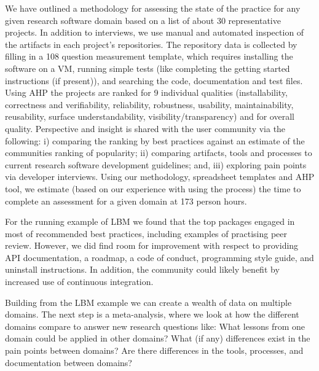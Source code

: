 \documentclass[runningheads]{llncs}
\begin{document}
We have outlined a methodology for assessing the state of the practice for any
given research software domain based on a list of about 30 representative
projects.  In addition to interviews, we use manual and automated inspection of
the artifacts in each project's repositories.  The repository data is collected
by filling in a 108 question measurement template, which requires installing the
software on a VM, running simple tests (like completing the getting started
instructions (if present)), and searching the code, documentation and test
files. Using AHP the projects are ranked for 9 individual qualities
(installability, correctness and verifiability, reliability, robustness,
usability, maintainability, reusability, surface understandability,
visibility/transparency) and for overall quality.  Perspective and insight is
shared with the user community via the following: i) comparing the ranking by
best practices against an estimate of the communities ranking of popularity; ii)
comparing artifacts, tools and processes to current research software
development guidelines; and, iii) exploring pain points via developer
interviews. Using our methodology, spreadsheet templates and AHP tool, we
estimate (based on our experience with using the process) the time to complete
an assessment for a given domain at 173 person hours.

For the running example of LBM we found that the top packages engaged in most of
recommended best practices, including examples of practising peer review.
However, we did find room for improvement with respect to providing API
documentation, a roadmap, a code of conduct, programming style guide, and
uninstall instructions.  In addition, the community could likely benefit by
increased use of continuous integration.

Building from the LBM example we can create a wealth of data on multiple
domains.  The next step is a meta-analysis, where we look at how the different
domains compare to answer new research questions like: What lessons from one
domain could be applied in other domains? What (if any) differences exist in the
pain points between domains?  Are there differences in the tools, processes, and
documentation between domains?

%
%
%


%
\end{document}
